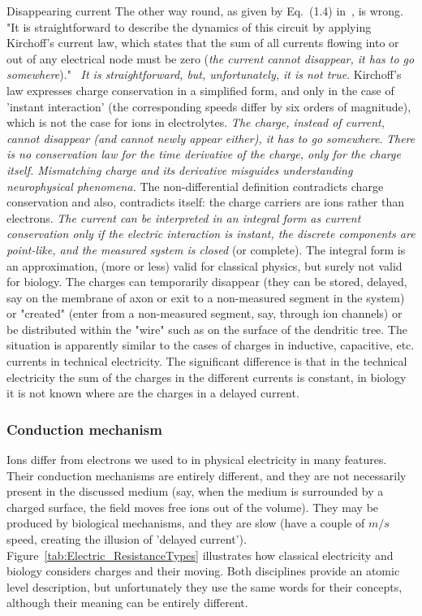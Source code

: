 {Disappearing current}
{
The other way round, as given by Eq.~(1.4) in~\cite{KochBiophysics:1999}, is wrong.
"It is straightforward to describe the dynamics of this circuit by applying Kirchoff's
current law, which states that the sum of all currents flowing into or out of any electrical
node must be zero (\textit{the current cannot disappear, it has to go somewhere})."~\cite{KochBiophysics:1999}
\textit{It is straightforward, but, unfortunately, it is not true}.
Kirchoff's law expresses charge conservation in a simplified form,
and only in the case of 'instant interaction' (the corresponding speeds differ by six orders of magnitude),
which is not the case for ions in electrolytes.
\textit{The charge, instead of current, cannot disappear (and cannot newly appear either), it has to go somewhere}. \textit{There is no conservation law for the time derivative of the charge, only for the charge itself.
Mismatching charge and its derivative misguides understanding neurophysical phenomena.}
The non-differential definition contradicts charge conservation and also, contradicts itself: the charge carriers are ions rather than electrons.
%
\textit{The current can be interpreted in an integral form as current conservation only if the electric interaction is instant,
the discrete components are point-like,
and the measured system is closed} (or complete).
The integral form  is an approximation, (more or less) valid for classical physics,
but surely not valid for biology. 
The charges can temporarily disappear (they can be stored, delayed, say on the membrane of axon or exit to a non-measured
segment in the system) or "created" (enter from a non-measured segment, say,  through ion channels) or
be distributed within the "wire" such as on the surface of the dendritic tree.
The situation is apparently similar to the cases of charges in inductive, capacitive, etc. currents in technical electricity. The significant difference is that in the technical electricity the sum of the charges in the different currents
is constant, in biology it is not known where are the charges
in a delayed current.
}


\subsubsection[Conduction mechanism]{Conduction mechanism\label{sec:PHYSICS_ConductionMechanism}}

Ions differ from electrons we used to in physical electricity in many features. Their conduction mechanisms
are entirely different, and they are not necessarily present 
in the discussed medium (say, when the medium is surrounded by a charged surface, the field moves free ions out of the volume). They may be produced by biological mechanisms, 
and they are slow (have a couple of $m/s$ speed, creating the illusion
of 'delayed current').
Figure~\ref{tab:Electric_ResistanceTypes} illustrates how 
classical electricity and biology considers charges and their moving.
Both disciplines provide an atomic level description, but unfortunately they use the same words for their concepts, although
their meaning can be entirely different. 


